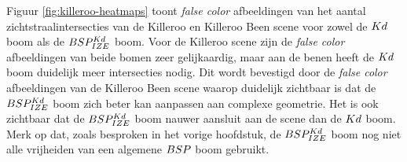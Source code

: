 Figuur \ref{fig:killeroo-heatmaps} toont \textit{false color} afbeeldingen van het aantal zichtstraalintersecties van de Killeroo en Killeroo Been scene voor zowel de $Kd$ boom als de $BSP^{Kd}_{IZE}$ boom. 
Voor de Killeroo scene zijn de \textit{false color} afbeeldingen van beide bomen zeer gelijkaardig, maar aan de benen heeft de $Kd$ boom duidelijk meer intersecties nodig.
Dit wordt bevestigd door de \textit{false color} afbeeldingen van de Killeroo Been scene waarop duidelijk zichtbaar is dat de $BSP^{Kd}_{IZE}$ boom zich beter kan aanpassen aan complexe geometrie.
Het is ook zichtbaar dat de $BSP^{Kd}_{IZE}$ boom nauwer aansluit aan de scene dan de $Kd$ boom.
Merk op dat, zoals besproken in het vorige hoofdstuk, de $BSP^{Kd}_{IZE}$ boom nog niet alle vrijheiden van een algemene $BSP$ boom gebruikt.\\


